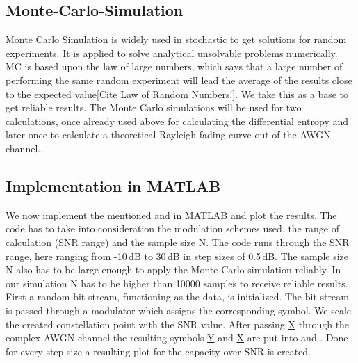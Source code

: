 \subsection{Monte-Carlo-Simulation}
\label{sec:MCS}
Monte Carlo Simulation is widely used in stochastic to get solutions for random experiments. It is applied to solve analytical unsolvable problems numerically. MC is based upon the law of large numbers, which says that a large number of performing the same random experiment will lead the average of the results close to the expected value[Cite Law of Random Numbers!]. We take this as a base to get reliable results. The Monte Carlo simulations will be used for two calculations, once already used above for calculating the differential entropy and later once to calculate a theoretical Rayleigh fading curve out of the AWGN channel. 

\subsection{Implementation in MATLAB}
\label{AWGNMAT}
We now implement the mentioned  and  in MATLAB and plot the results. The code has to take into consideration the modulation schemes used, the range of calculation (SNR range) and the sample size N. The code runs through the SNR range, here ranging from -10\,dB to 30\,dB in step sizes of 0.5\,dB. The sample size N also has to be large enough to apply the Monte-Carlo simulation reliably. In our simulation N has to be higher than 10000 samples to receive reliable results. First a random bit stream, functioning as the data, is initialized. The bit stream is passed through a modulator which assigns the corresponding symbol. We scale the created constellation point with the SNR value. After passing \underline{X} through the complex AWGN channel the resulting symbols \underline{Y} and \underline{X} are put into  and . Done for every step size a resulting plot for the capacity over SNR is created.  
    

